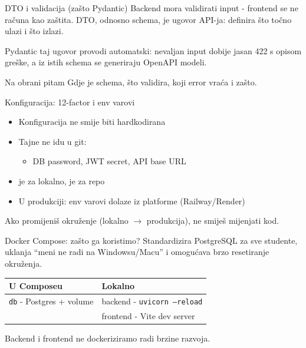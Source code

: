 \begin{frame}{DTO i validacija (zašto Pydantic)}
Backend mora validirati input - frontend se ne računa kao zaštita. DTO, odnosno schema, je ugovor API-ja: definira što točno ulazi i što izlazi.

\vspace{0.6em}
Pydantic taj ugovor provodi automatski: nevaljan input dobije jasan 422 s opisom greške, a iz istih schema se generiraju OpenAPI modeli.

\vspace{0.8em}
\begin{block}{Na obrani pitam}
Gdje je schema, što validira, koji error vraća i zašto.
\end{block}
\end{frame}

\begin{frame}{Konfiguracija: 12-factor i env varovi}
\begin{itemize}
  \item Konfiguracija ne smije biti hardkodirana
  \item Tajne ne idu u git:
  \begin{itemize}
    \item DB password, JWT secret, API base URL
  \end{itemize}
  \item {} je za lokalno,  je za repo
  \item U produkciji: env varovi dolaze iz platforme (Railway/Render)
\end{itemize}

\vspace{0.6em}
Ako promijeniš okruženje (lokalno $\rightarrow$ produkcija), ne smiješ mijenjati kod.
\end{frame}

\begin{frame}{Docker Compose: zašto ga koristimo?}
Standardizira PostgreSQL za sve studente, uklanja \enquote{meni ne radi na Windowsu/Macu} i omogućava brzo resetiranje okruženja.

\vspace{0.8em}
\begin{tabular}{@{}p{5.2cm}p{5.2cm}@{}}
  \toprule
  \textbf{U Composeu} & \textbf{Lokalno} \\
  \midrule
  \texttt{db} - Postgres + volume & backend - \texttt{uvicorn --reload} \\
   & frontend - Vite dev server \\
  \bottomrule
\end{tabular}

\vspace{0.6em}
Backend i frontend ne dockeriziramo radi brzine razvoja.
\end{frame}

